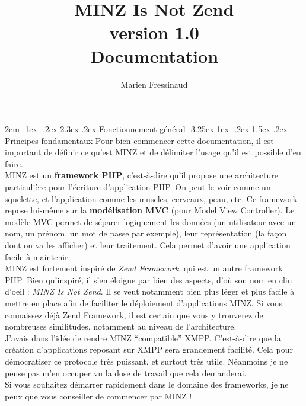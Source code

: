 \documentclass[a4paper,11pt]{article}
\title{MINZ Is Not Zend\\{\small version 1.0}\\[4em] \textbf{Documentation}\\[4em]}
\author{Marien Fressinaud}
\makeatletter
\renewcommand\section{\@startsection{section}{1}{\z@}%
	{2cm \@plus -1ex \@minus -.2ex}%
	{2.3ex \@plus.2ex}%
	{\color{bleuClair}\reset@font\Large\bfseries}}
\renewcommand{\subsection}{\@startsection{subsection}{2}{\z@}%
             {-3.25ex\@plus -1ex \@minus -.2ex}%
             {1.5ex \@plus .2ex}%
             {\color{bleuFonce}\normalfont\large\bfseries}}
\makeatother
\begin{document}
\maketitle

\newpage
\tableofcontents
\newpage
\section{Fonctionnement général}
\subsection{Principes fondamentaux}
Pour bien commencer cette documentation, il est important de définir ce qu'est MINZ et de délimiter l'usage qu'il est possible d'en faire.\\

MINZ est un \textbf{framework PHP}, c'est-à-dire qu'il propose une architecture particulière pour l'écriture d'application PHP. On peut le voir comme un squelette, et l'application comme les muscles, cerveaux, peau, etc. Ce framework repose lui-même sur la \textbf{modélisation MVC} (pour Model View Controller). Le modèle MVC permet de séparer logiquement les données (un utilisateur avec un nom, un prénom, un mot de passe par exemple), leur représentation (la façon dont on va les afficher) et leur traitement. Cela permet d'avoir une application facile à maintenir.\\

MINZ est fortement inspiré de \textit{Zend Framework}, qui est un autre framework PHP. Bien qu'inspiré, il s'en éloigne par bien des aspects, d'où son nom en clin d'oeil : \textit{MINZ Is Not Zend}. Il se veut notamment bien plus léger et plus facile à mettre en place afin de faciliter le déploiement d'applications MINZ. Si vous connaissez déjà Zend Framework, il est certain que vous y trouverez de nombreuses similitudes, notamment au niveau de l'architecture.\\

J'avais dans l'idée de rendre MINZ ``compatible'' XMPP. C'est-à-dire que la création d'applications reposant sur XMPP sera grandement facilité. Cela pour démocratiser ce protocole très puissant, et surtout très utile. Néanmoins je ne pense pas m'en occuper vu la dose de travail que cela demanderai.\\

Si vous souhaitez démarrer rapidement dans le domaine des frameworks, je ne peux que vous conseiller de commencer par MINZ !
\end{document}

